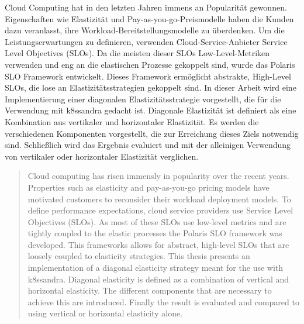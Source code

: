 \begin{kurzfassung}

Cloud Computing hat in den letzten Jahren immens an Popularität gewonnen. Eigenschaften wie Elastizität und Pay-as-you-go-Preismodelle haben die Kunden dazu veranlasst, ihre Workload-Bereitstellungsmodelle zu überdenken. Um die Leistungserwartungen zu definieren, verwenden Cloud-Service-Anbieter Service Level Objectives (SLOs). Da die meisten dieser SLOs Low-Level-Metriken verwenden und eng an die elastischen Prozesse gekoppelt sind, wurde das Polaris SLO Framework entwickelt. Dieses Framework ermöglicht abstrakte, High-Level SLOs, die lose an Elastizitätsstrategien gekoppelt sind. In dieser Arbeit wird eine Implementierung einer diagonalen Elastizitätsstrategie vorgestellt, die für die Verwendung mit k8ssandra gedacht ist. Diagonale Elastizität ist definiert als eine Kombination aus vertikaler und horizontaler Elastizität. Es werden die verschiedenen Komponenten vorgestellt, die zur Erreichung dieses Ziels notwendig sind. Schließlich wird das Ergebnis evaluiert und mit der alleinigen Verwendung von vertikaler oder horizontaler Elastizität verglichen.

\end{kurzfassung}

\begin{abstract}

Cloud computing has risen immensly in popularity over the recent years. Properties such as elasticity and pay-as-you-go pricing models have motivated customers to reconsider their workload deployment models. To define performance expectations, cloud service providers use Service Level Objectives (SLOs). As most of these SLOs use low-level metrics and are tightly coupled to the elastic processes the Polaris SLO framework was developed. This frameworks allows for abstract, high-level SLOs that are loosely coupled to elasticity strategies. This thesis presents an implementation of a diagonal elasticity strategy meant for the use with k8ssandra. Diagonal elasticity is defined as a combination of vertical and horizontal elasticity. The different components that are necessary to achieve this are introduced. Finally the result is evaluated and compared to using vertical or horizontal elasticity alone.

\end{abstract}
